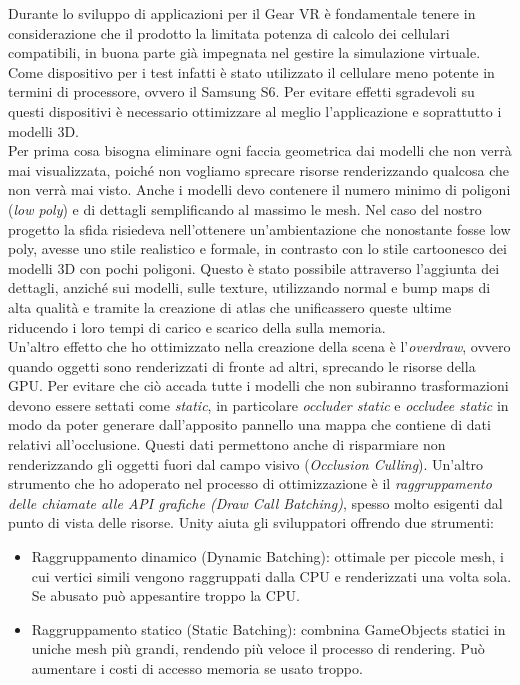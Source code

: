 Durante lo sviluppo di applicazioni per il Gear VR è fondamentale tenere in considerazione che il prodotto la limitata potenza di calcolo dei cellulari compatibili, in buona parte già impegnata nel gestire la simulazione virtuale. Come dispositivo per i test infatti è stato utilizzato il cellulare meno potente in termini di processore, ovvero il Samsung S6. Per evitare effetti sgradevoli su questi dispositivi è necessario ottimizzare al meglio l'applicazione e soprattutto i modelli 3D.\\
Per prima cosa bisogna eliminare ogni faccia geometrica dai modelli che non verrà mai visualizzata, poiché non vogliamo sprecare risorse renderizzando qualcosa che non verrà mai visto. Anche i modelli devo contenere il numero minimo di poligoni (\textit{low poly}) e di dettagli semplificando al massimo le mesh. Nel caso del nostro progetto la sfida risiedeva nell'ottenere un'ambientazione che nonostante fosse low poly, avesse uno stile realistico e formale, in contrasto con lo stile cartoonesco dei modelli 3D con pochi poligoni. Questo è stato possibile attraverso l'aggiunta dei dettagli, anziché sui modelli, sulle texture, utilizzando normal e bump maps di alta qualità e tramite la creazione di atlas che unificassero queste ultime riducendo i loro tempi di carico e scarico della sulla memoria. \\
Un'altro effetto che ho ottimizzato nella creazione della scena è l'\textit{overdraw}, ovvero quando oggetti sono renderizzati di fronte ad altri, sprecando le risorse della GPU. Per evitare che ciò accada tutte i modelli che non subiranno trasformazioni devono essere settati come \textit{static}, in particolare \textit{occluder static} e \textit{occludee static} in modo da poter generare dall'apposito pannello una mappa che contiene di dati relativi all'occlusione. Questi dati permettono anche di risparmiare non renderizzando gli oggetti fuori dal campo visivo (\textit{Occlusion Culling}).
Un'altro strumento che ho adoperato nel processo di ottimizzazione è il \textit{raggruppamento delle chiamate alle API grafiche (Draw Call Batching)}, spesso molto esigenti dal punto di vista delle risorse. Unity aiuta gli sviluppatori
offrendo due strumenti:
\begin{itemize}
	\item Raggruppamento dinamico (Dynamic Batching): ottimale per piccole mesh, i cui vertici simili vengono raggruppati dalla CPU e renderizzati una volta sola. Se abusato può appesantire troppo la CPU.
	\item Raggruppamento statico (Static Batching): combnina GameObjects statici in uniche mesh più grandi, rendendo più veloce il processo di rendering. Può aumentare i costi di accesso memoria se usato troppo.
\end{itemize} 
